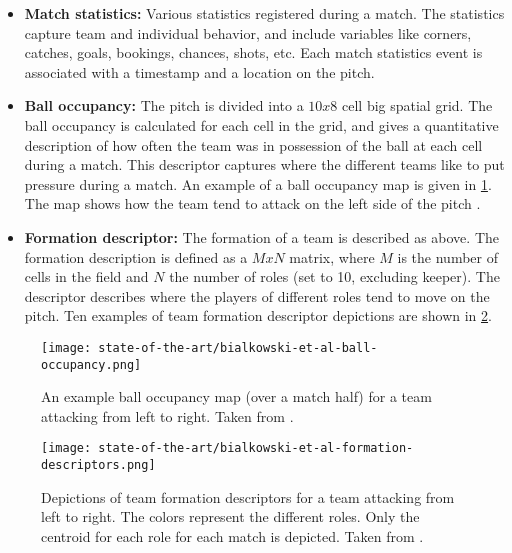 \begin{itemize}
    \item \textbf{Match statistics:} Various statistics registered during a match. The statistics capture team and individual behavior, and include variables like corners, catches, goals, bookings, chances, shots, etc. Each match statistics event is associated with a timestamp and a location on the pitch.
    \item \textbf{Ball occupancy:} The pitch is divided into a $10x8$ cell big spatial grid. The ball occupancy is calculated for each cell in the grid, and gives a quantitative description of how often the team was in possession of the ball at each cell during a match. This descriptor captures where the different teams like to put pressure during a match. An example of a ball occupancy map is given in \cref{fig:bialkowski-et-al-ball-occupancy}. The map shows how the team tend to attack on the left side of the pitch \citep{bib:bialkowski-lucey-carr-yue-sridharan-matthews-2014}.
    \item \textbf{Formation descriptor:} The formation of a team is described as above. The formation description is defined as a $MxN$ matrix, where $M$ is the number of cells in the field and $N$ the number of roles (set to 10, excluding keeper). The descriptor describes where the players of different roles tend to move on the pitch. Ten examples of team formation descriptor depictions are shown in \cref{fig:bialkowski-et-al-formation-descriptors}.
\end{itemize}

\begin{figure}
    \centering
    \texttt{[image: state-of-the-art/bialkowski-et-al-ball-occupancy.png]}
    \caption{An example ball occupancy map (over a match half) for a team attacking from left to right. Taken from \citet{bib:bialkowski-lucey-carr-yue-sridharan-matthews-2014}.}
    \label{fig:bialkowski-et-al-ball-occupancy}
\end{figure}

\begin{figure}
    \centering
    \texttt{[image: state-of-the-art/bialkowski-et-al-formation-descriptors.png]}
    \caption{Depictions of team formation descriptors for a team attacking from left to right. The colors represent the different roles. Only the centroid for each role for each match is depicted. Taken from \citet{bib:bialkowski-lucey-carr-yue-sridharan-matthews-2014}.}
    \label{fig:bialkowski-et-al-formation-descriptors}
\end{figure}

